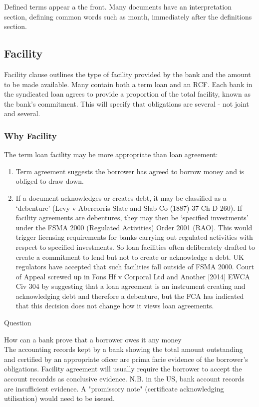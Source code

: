 \documentclass[
]{article}
\providecommand{\tightlist}{%
  \setlength{\itemsep}{0pt}\setlength{\parskip}{0pt}}
\newenvironment{env-06f4cd75-5590-49f1-9dac-bb1e27002edf}
{
    \savenotes\tcolorbox[blanker,breakable,left=5pt,borderline west={2pt}{-4pt}{gray}]
}
{
    \endtcolorbox\spewnotes
}
\begin{document}
Defined terms appear a the front. Many documents have an interpretation
section, defining common words such as month, immediately after the
definitions section.

\hypertarget{facility}{%
\subsection{Facility}\label{facility}}

Facility clause outlines the type of facility provided by the bank and
the amount to be made available. Many contain both a term loan and an
RCF. Each bank in the syndicated loan agrees to provide a proportion of
the total facility, known as the bank's commitment. This will specify
that obligations are several - not joint and several.

\hypertarget{why-facility}{%
\subsubsection{Why Facility}\label{why-facility}}

The term loan facility may be more appropriate than loan agreement:

\begin{enumerate}
\tightlist
\item
  Term agreement suggests the borrower has agreed to borrow money and is
  obliged to draw down.
\item
  If a document acknowledges or creates debt, it may be classified as a
  `debenture' (Levy v Abercorris Slate and Slab Co (1887) 37 Ch D 260).
  If facility agreements are debentures, they may then be `specified
  investments' under the FSMA 2000 (Regulated Activities) Order 2001
  (RAO). This would trigger licensing requirements for banks carrying
  out regulated activities with respect to specified investments. So
  loan facilities often deliberately drafted to create a commitment to
  lend but not to create or acknowledge a debt. UK regulators have
  accepted that such facilities fall outside of FSMA 2000. Court of
  Appeal screwed up in Fons Hf v Corporal Ltd and Another {[}2014{]}
  EWCA Civ 304 by suggesting that a loan agreement is an instrument
  creating and acknowledging debt and therefore a debenture, but the FCA
  has indicated that this decision does not change how it views loan
  agreements.
\end{enumerate}

\begin{env-06f4cd75-5590-49f1-9dac-bb1e27002edf}

Question

How can a bank prove that a borrower owes it any money\\
The accounting records kept by a bank showing the total amount
outstanding and certified by an appropriate oficer are prima facie
evidence of the borrower's obligations. Facility agreement will usually
require the borrower to accept the account recordds as conclusive
evidence. N.B. in the US, bank account records are insufficient
evidence. A "promissory note" (certificate acknowledging utilisation)
would need to be issued.

\end{env-06f4cd75-5590-49f1-9dac-bb1e27002edf}
\end{document}
